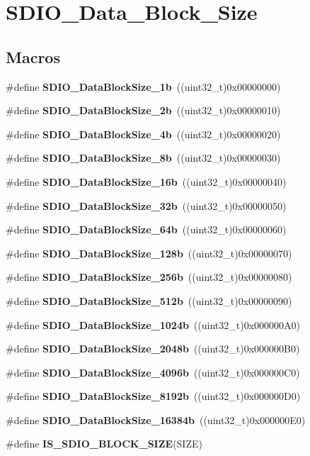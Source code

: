 \section{S\+D\+I\+O\+\_\+\+Data\+\_\+\+Block\+\_\+\+Size}
\label{group__SDIO__Data__Block__Size}
\subsection*{Macros}
\begin{DoxyCompactItemize}
\item 
\#define \textbf{ S\+D\+I\+O\+\_\+\+Data\+Block\+Size\+\_\+1b}~((uint32\+\_\+t)0x00000000)
\item 
\#define \textbf{ S\+D\+I\+O\+\_\+\+Data\+Block\+Size\+\_\+2b}~((uint32\+\_\+t)0x00000010)
\item 
\#define \textbf{ S\+D\+I\+O\+\_\+\+Data\+Block\+Size\+\_\+4b}~((uint32\+\_\+t)0x00000020)
\item 
\#define \textbf{ S\+D\+I\+O\+\_\+\+Data\+Block\+Size\+\_\+8b}~((uint32\+\_\+t)0x00000030)
\item 
\#define \textbf{ S\+D\+I\+O\+\_\+\+Data\+Block\+Size\+\_\+16b}~((uint32\+\_\+t)0x00000040)
\item 
\#define \textbf{ S\+D\+I\+O\+\_\+\+Data\+Block\+Size\+\_\+32b}~((uint32\+\_\+t)0x00000050)
\item 
\#define \textbf{ S\+D\+I\+O\+\_\+\+Data\+Block\+Size\+\_\+64b}~((uint32\+\_\+t)0x00000060)
\item 
\#define \textbf{ S\+D\+I\+O\+\_\+\+Data\+Block\+Size\+\_\+128b}~((uint32\+\_\+t)0x00000070)
\item 
\#define \textbf{ S\+D\+I\+O\+\_\+\+Data\+Block\+Size\+\_\+256b}~((uint32\+\_\+t)0x00000080)
\item 
\#define \textbf{ S\+D\+I\+O\+\_\+\+Data\+Block\+Size\+\_\+512b}~((uint32\+\_\+t)0x00000090)
\item 
\#define \textbf{ S\+D\+I\+O\+\_\+\+Data\+Block\+Size\+\_\+1024b}~((uint32\+\_\+t)0x000000\+A0)
\item 
\#define \textbf{ S\+D\+I\+O\+\_\+\+Data\+Block\+Size\+\_\+2048b}~((uint32\+\_\+t)0x000000\+B0)
\item 
\#define \textbf{ S\+D\+I\+O\+\_\+\+Data\+Block\+Size\+\_\+4096b}~((uint32\+\_\+t)0x000000\+C0)
\item 
\#define \textbf{ S\+D\+I\+O\+\_\+\+Data\+Block\+Size\+\_\+8192b}~((uint32\+\_\+t)0x000000\+D0)
\item 
\#define \textbf{ S\+D\+I\+O\+\_\+\+Data\+Block\+Size\+\_\+16384b}~((uint32\+\_\+t)0x000000\+E0)
\item 
\#define \textbf{ I\+S\+\_\+\+S\+D\+I\+O\+\_\+\+B\+L\+O\+C\+K\+\_\+\+S\+I\+ZE}(S\+I\+ZE)
\end{DoxyCompactItemize}


